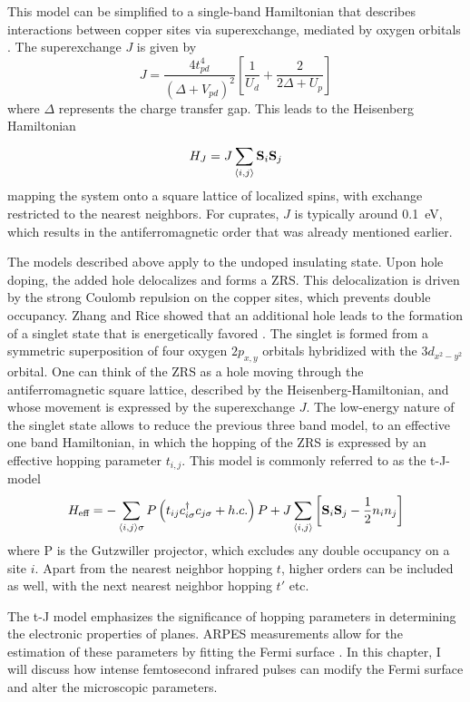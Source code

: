 This model can be simplified to a single-band Hamiltonian that describes interactions between copper sites via superexchange, mediated by oxygen orbitals \cite{anderson_new_1959, zhang_effective_1988, emery_mechanism_1988}.
The superexchange $J$ is given by
\begin{equation}
	J= \frac{4t_{pd}^4}{\left(\Delta + V_{pd} \right)^2} \left[\frac{1}{U_d} + \frac{2}{2\Delta + U_p}\right]
\end{equation}
where $\Delta$ represents the charge transfer gap.
This leads to the Heisenberg Hamiltonian
\begin{equation}
	H_J = J \sum_{\braket{i,j}}^{} \mathbf{S}_i \mathbf{S}_j
\end{equation}
mapping the system onto a square lattice of localized spins, with exchange restricted to the nearest neighbors.
For cuprates, $J$ is typically around \qty{0.1}{\electronvolt}, which results in the antiferromagnetic order that was already mentioned earlier.

The models described above apply to the undoped insulating state.
Upon hole doping, the added hole delocalizes and forms a ZRS.
This delocalization is driven by the strong Coulomb repulsion on the copper sites, which prevents double occupancy.
Zhang and Rice showed that an additional hole leads to the formation of a singlet state that is energetically favored \cite{zhang_effective_1988}.
The singlet is formed from a symmetric superposition of four oxygen $2p_{x,y}$ orbitals hybridized with the  $3d_{x^2-y^2}$ orbital.
One can think of the ZRS as a hole moving through the antiferromagnetic square lattice, described by the Heisenberg-Hamiltonian, and whose movement is expressed by the superexchange $J$.
The low-energy nature of the singlet state allows to reduce the previous three band model, to an effective one band Hamiltonian, in which the hopping of the ZRS is expressed by an effective hopping parameter $t_{i,j}$.
This model is commonly referred to as the t-J-model
\begin{equation}
	H_\text{eff} = - \sum_{\braket{i,j}\sigma} P \left( t_{ij} c_{i\sigma}^\dagger c_{j\sigma} + h.c. \right) P + J \sum_{\braket{i,j}} \left[\mathbf{S}_i \mathbf{S}_j - \frac{1}{2} n_i n_j\right]
\end{equation}
where P is the Gutzwiller projector, which excludes any double occupancy on a site $i$.
Apart from the nearest neighbor hopping $t$, higher orders can be included as well, with the next nearest neighbor hopping $t'$ etc.

The t-J model emphasizes the significance of hopping parameters in determining the electronic properties of  planes.
ARPES measurements allow for the estimation of these parameters by fitting the Fermi surface \cite{norman_phenomenological_1995}.
In this chapter, I will discuss how intense femtosecond infrared pulses can modify the Fermi surface and alter the microscopic parameters.

